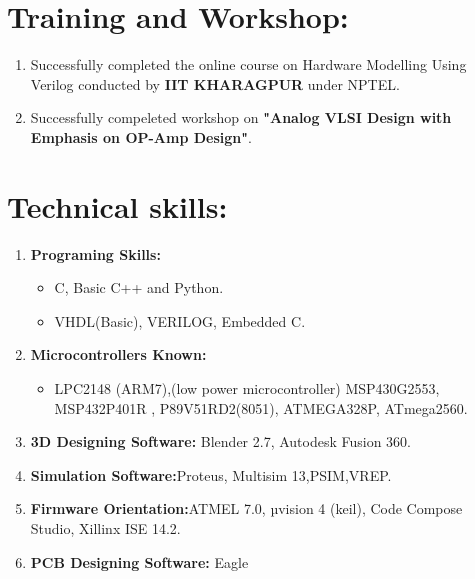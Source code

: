 \documentclass[16pt,a4paper]{article}
\begin{document}
\section{Training and Workshop:} 
\begin{enumerate}
	\item Successfully completed the online course on Hardware Modelling Using Verilog conducted by \textbf{IIT KHARAGPUR} under NPTEL.
	\item Successfully compeleted workshop on \textbf{"Analog VLSI Design with Emphasis on OP-Amp Design"}.
\end{enumerate} 
\section{Technical skills:} 
\begin{enumerate}
	\item \textbf{Programing Skills:}
	\begin{itemize}
		\item C, Basic C++ and  Python.
		\item VHDL(Basic), VERILOG, Embedded C.
	\end{itemize}
	\item \textbf{Microcontrollers Known:}
	\begin{itemize}
		\item LPC2148 (ARM7),(low power microcontroller) MSP430G2553, MSP432P401R , P89V51RD2(8051), ATMEGA328P, ATmega2560.
	\end{itemize}
	\item \textbf{3D Designing Software:}
	Blender 2.7, Autodesk Fusion 360.
	\item \textbf{Simulation Software:}Proteus, Multisim 13,PSIM,VREP.
	\item \textbf{Firmware Orientation:}ATMEL 7.0, µvision 4 (keil), Code Compose \\Studio, Xillinx ISE 14.2.
	\item \textbf{PCB Designing Software:} Eagle 
\end{enumerate}

   
\end{document}
